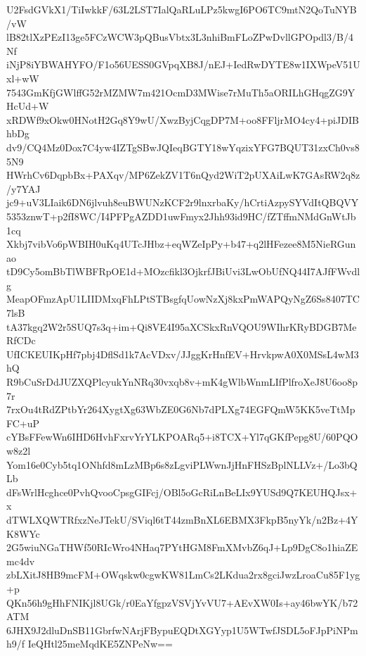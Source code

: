 U2FsdGVkX1/TiIwkkF/63L2LST7IalQaRLuLPz5kwgI6PO6TC9mtN2QoTuNYB/vW
lB82tlXzPEzI13ge5FCzWCW3pQBusVbtx3L3nhiBmFLoZPwDvllGPOpdl3/B/4Nf
iNjP8iYBWAHYFO/F1o56UESS0GVpqXB8J/nEJ+IedRwDYTE8w1IXWpeV51Uxl+wW
7543GmKfjGWlffG52rMZMW7m421OcmD3MWise7rMuTh5aORILhGHqgZG9YHcUd+W
xRDWf9xOkw0HNotH2Gq8Y9wU/XwzByjCqgDP7M+oo8FFljrMO4cy4+piJDIBhbDg
dv9/CQ4Mz0Dox7C4yw4IZTgSBwJQIeqBGTY18wYqzixYFG7BQUT31zxCh0vs85N9
HWrhCv6DqpbBx+PAXqv/MP6ZekZV1T6nQyd2WiT2pUXAiLwK7GAsRW2q8z/y7YAJ
jc9+uV3LIaik6DN6jlvuh8euBWUNzKCF2r9lnxrbaKy/hCrtiAzpySYVdItQBQVY
5353znwT+p2fI8WC/I4PFPgAZDD1uwFmyx2Jhh93id9HC/fZTffmNMdGnWtJb1cq
Xkbj7vibVo6pWBIH0uKq4UTcJHbz+eqWZeIpPy+b47+q2lHFezee8M5NieRGunao
tD9Cy5omBbTlWBFRpOE1d+MOzcfikl3OjkrfJBiUvi3LwObUfNQ44I7AJfFWvdlg
MeapOFmzApU1LIIDMxqFhLPtSTBsgfqUowNzXj8kxPmWAPQyNgZ6Ss8407TC7lsB
tA37kgq2W2r5SUQ7s3q+im+Qi8VE4I95aXCSkxRnVQOU9WIhrKRyBDGB7MeRfCDc
UfICKEUIKpHf7pbj4DflSd1k7AcVDxv/JJggKrHnfEV+HrvkpwA0X0MSsL4wM3hQ
R9bCuSrDdJUZXQPlcyukYnNRq30vxqb8v+mK4gWlbWnmLIfPlfroXeJ8U6oo8p7r
7rxOu4tRdZPtbYr264XygtXg63WbZE0G6Nb7dPLXg74EGFQmW5KK5veTtMpFC+uP
cYBsFFewWn6IHD6HvhFxrvYrYLKPOARq5+i8TCX+Yl7qGKfPepg8U/60PQOw8z2l
Yom16e0Cyb5tq1ONhfd8mLzMBp6s8zLgviPLWwnJjHnFHSzBplNLLVz+/Lo3bQLb
dFsWrlHcghce0PvhQvooCpsgGIFcj/OBl5oGcRiLnBeLIx9YUSd9Q7KEUHQJsx+x
dTWLXQWTRfxzNeJTekU/SViql6tT44zmBnXL6EBMX3FkpB5nyYk/n2Bz+4YK8WYc
2G5wiuNGaTHWf50RIcWro4NHaq7PYtHGM8FmXMvbZ6qJ+Lp9DgC8o1hiaZEmc4dv
zbLXitJ8HB9mcFM+OWqskw0cgwKW81LmCs2LKdua2rx8gciJwzLroaCu85F1yg+p
QKn56h9gHhFNIKjl8UGk/r0EaYfgpzVSVjYvVU7+AEvXW0Is+ay46bwYK/b72ATM
6JHX9J2dluDnSB11GbrfwNArjFBypuEQDtXGYyp1U5WTwfJSDL5oFJpPiNPmh9/f
IeQHtl25meMqdKE5ZNPeNw==
